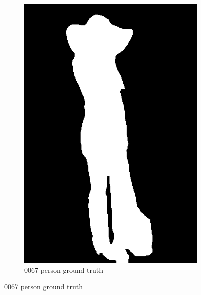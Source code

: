 \documentclass{csc_assignment5}
\begin{document}
\begin{description}
\begin{figure}[h!]
    \quad
    \begin{subfigure}[b]{0.3\textwidth}
        \includegraphics[width=\textwidth]{labels/0067_person.png}
        \caption{0067 person ground truth}
    \end{subfigure}
\end{figure}


\end{description}
\end{document}

